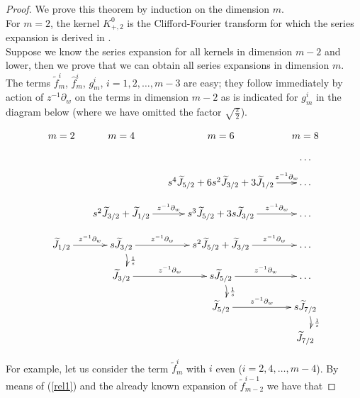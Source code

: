 \documentclass{amsart}
\theoremstyle{remark}
\begin{document}
\begin{proof}
We prove this theorem by induction on the dimension $m$.\\
For $m=2$, the kernel $K_{+,2}^0$ is the Clifford-Fourier transform for which the series expansion is derived in \cite{DBXu}.\\
Suppose we know the series expansion for all kernels in dimension $m-2$ and lower, then we prove that we can obtain all series expansions in dimension $m$.\\
The terms $\tilde{f}_m^i$, $\hat{f}_m^i$, $g_m^i$, $i=1,2,\ldots,m-3$ are easy; they follow immediately by action of $z^{-1} \partial_w$ on the terms in dimension $m-2$ as is indicated for $g_m^i$ in the diagram below (where we have omitted the factor $\sqrt{\frac{\pi}{2}}$). 

\[
\xymatrix@=12pt{m=2&m=4&m=6&m=8\\
&&& \ldots\\
&&s^{4}\widetilde{J}_{5/2}+ 6 s^{2} \widetilde{J}_{3/2}+ 3 \widetilde{J}_{1/2}\ar[r]^-{z^{-1}\partial_{w}}& \ldots\\
&s^{2}\widetilde{J}_{3/2} + \widetilde{J}_{1/2}\ar[r]^-{z^{-1}\partial_{w}}&s^{3 }\widetilde{J}_{5/2}+ 3 s \widetilde{J}_{3/2}\ar[r]^-{z^{-1}\partial_{w}}& \ldots\\
\widetilde{J}_{1/2} \ar[r]^-{z^{-1}\partial_{w}}&s \widetilde{J}_{3/2} \ar@/^/[d]^{\frac{1}{s}} \ar[r]^-{z^{-1}\partial_{w}}&s^{2}\widetilde{J}_{5/2}+ \widetilde{J}_{3/2}\ar[r]^-{z^{-1}\partial_{w}}& \ldots\\
&\widetilde{J}_{3/2}\ar[r]^-{z^{-1}\partial_{w}}&s\widetilde{J}_{5/2} \ar@/^/[d]^{\frac{1}{s}}\ar[r]^-{z^{-1}\partial_{w}}& \ldots \\
&&\widetilde{J}_{5/2}\ar[r]^-{z^{-1}\partial_{w}}&s \widetilde{J}_{7/2}\ar@/^/[d]^{\frac{1}{s}}  \\
&&&\widetilde{J}_{7/2}
}
\]

For example, let us consider the term $\tilde{f}_m^i$ with $i$ even ($i=2,4,\ldots,m-4$). By means of (\ref{rel1}) and the already known expansion of $\tilde{f}_{m-2}^{i-1}$ we have that


\end{proof}
\end{document}
